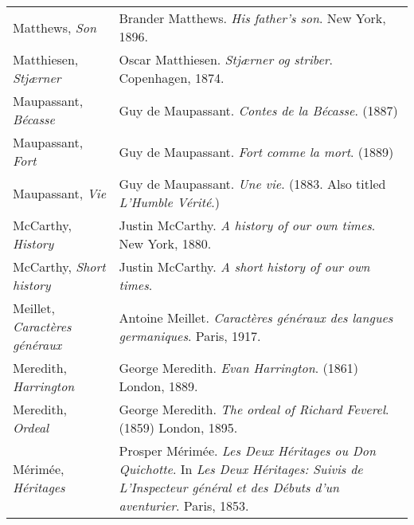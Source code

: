 \begin{longtable}{p{} p{}}
Matthews, \textit{Son} & Brander Matthews. \textit{His father's son}. New York, 1896. \\

Matthiesen, \textit{Stjærner} & Oscar Matthiesen. \textit{Stjærner og striber}. Copenhagen, 1874. \\ %

Maupassant, \textit{Bécasse} & Guy de Maupassant. \textit{Contes de la Bécasse}. (1887) \\
Maupassant, \textit{Fort} & Guy de Maupassant. \textit{Fort comme la mort}. (1889) \\
Maupassant, \textit{Vie} & Guy de Maupassant. \textit{Une vie}. (1883. Also titled \textit{L'Humble Vérité}.) \\

McCarthy, \textit{History} & Justin McCarthy. \textit{A history of our own times}. New York, 1880. \\ %
McCarthy, \textit{Short history} & Justin McCarthy. \textit{A short history of our own times}. \\ %

\raggedright {Meillet, \textit{Caractères généraux}} & Antoine Meillet. \textit{Caractères généraux des langues germaniques}. Paris, 1917. \\ 

Meredith, \textit{Harrington} & George Meredith. \textit{Evan Harrington}. (1861) London, 1889. \\
Meredith, \textit{Ordeal} & George Meredith. \textit{The ordeal of Richard Feverel}. (1859) London, 1895. \\

Mérimée, \textit{Héritages} & Prosper Mérimée. \textit{Les Deux Héritages ou Don Quichotte}. In \textit{Les Deux Héritages: Suivis de L'Inspecteur général et des Débuts d'un aventurier}. Paris, 1853.  \\


\end{longtable}
